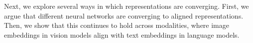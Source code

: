 \documentclass{article}
\theoremstyle{plain}
\theoremstyle{definition}
\theoremstyle{remark}
\begin{document}


Next, we explore several ways in which representations are converging. First, we argue that different neural networks are converging to aligned representations. Then, we show that this continues to hold across modalities, where image embeddings in vision models align with text embeddings in language models.


\end{document}
